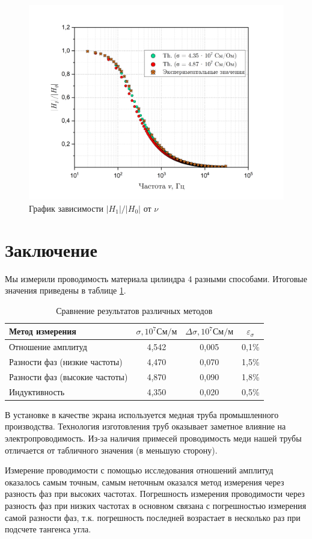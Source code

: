 \documentclass[a4paper, 12pt]{article}
\begin{document}
    \begin{figure}[H]
        \centering
        \includegraphics[width = 14 cm]{images/graph_ln_coeff.png}
        \caption{График зависимости $\lvert H_1 \rvert / \lvert H_0 \rvert$ от $\nu$}
        \label{graph:ln_coeff}
    \end{figure}

    \section{Заключение}

    Мы измерили проводимость материала цилиндра 4 разными способами. Итоговые значения приведены в таблице \ref{table:res}.

    \begin{table}[H]
        \centering
        \begin{tabular}{lccc}
        Метод измерения & $\sigma, 10^{7} См/м$ & $\Delta\sigma, 10^{7} См/м$ & $\varepsilon_{\sigma}$ \\
        \toprule
        Отношение амплитуд & 4,542 & 0,005 & 0,1\% \\
        Разности фаз (низкие частоты) & 4,470 & 0,070 & 1,5\% \\
        Разности фаз (высокие частоты) & 4,870 & 0,090 & 1,8\% \\
        Индуктивность & 4,350 & 0,020 & 0,5\%\\
        \end{tabular}
        \caption{Сравнение результатов различных методов}
        \label{table:res}
    \end{table}
    
    В установке в качестве экрана используется медная труба промышленного производства. Технология изготовления труб оказывает заметное влияние на электропроводимость. Из-за наличия примесей проводимость меди нашей трубы отличается от табличного значения (в меньшую сторону).

    Измерение проводимости с помощью исследования отношений амплитуд оказалось самым точным, самым неточным оказался метод измерения через разность фаз при высоких частотах. Погрешность измерения проводимости через разность фаз при низких частотах в основном связана с погрешностью измерения самой разности фаз, т.к. погрешность последней возрастает в несколько раз при подсчете тангенса угла.
\end{document}
